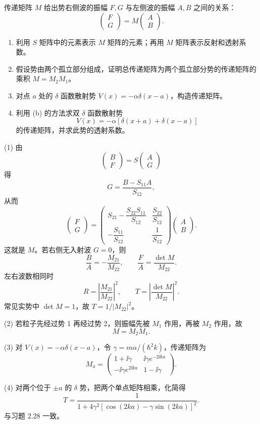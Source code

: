 \begin{question}
传递矩阵 $M$ 给出势右侧波的振幅 $F,G$ 与左侧波的振幅 $A,B$ 之间的关系：
\[
\begin{pmatrix}F\\G\end{pmatrix}=M\begin{pmatrix}A\\B\end{pmatrix}.
\]
\begin{enumerate}
\item 利用 $S$ 矩阵中的元素表示 $M$ 矩阵的元素；再用 $M$ 矩阵表示反射和透射系数。
\item 假设势由两个孤立部分组成，证明总传递矩阵为两个孤立部分势的传递矩阵的乘积 $M=M_2M_1$。
\item 对点 $a$ 处的 $\delta$ 函数散射势 $V(x)=-\alpha\delta(x-a)$，构造传递矩阵。
\item 利用 (b) 的方法求双 $\delta$ 函数散射势
\[
V(x)=-\alpha[\delta(x+a)+\delta(x-a)]
\]
的传递矩阵，并求此势的透射系数。
\end{enumerate}
\end{question}
\begin{solution}
(1) 由
\[
\begin{pmatrix}B\\F\end{pmatrix}
=S\begin{pmatrix}A\\G\end{pmatrix}
\]
得
\[
G=\frac{B-S_{11}A}{S_{12}},
\]
从而
\[
\begin{pmatrix}F\\G\end{pmatrix}
=\begin{pmatrix}
S_{21}-\dfrac{S_{22}S_{11}}{S_{12}}&\dfrac{S_{22}}{S_{12}}\\[0.8em]
-\dfrac{S_{11}}{S_{12}}&\dfrac1{S_{12}}
\end{pmatrix}
\begin{pmatrix}A\\B\end{pmatrix}.
\]
这就是 $M$。若右侧无入射波 $G=0$，则
\[
\frac BA=-\frac{M_{21}}{M_{22}},
\qquad
\frac FA=\frac{\det M}{M_{22}}.
\]
左右波数相同时
\[
R=\left|\frac{M_{21}}{M_{22}}\right|^2,
\qquad
T=\left|\frac{\det M}{M_{22}}\right|^2.
\]
常见实势中 $\det M=1$，故 $T=1/|M_{22}|^2$。

(2) 若粒子先经过势 1 再经过势 2，则振幅先被 $M_1$ 作用，再被 $M_2$ 作用，故
\[
M=M_2M_1.
\]

(3) 对 $V(x)=-\alpha\delta(x-a)$，令 $\gamma=m\alpha/(\hbar^2k)$，传递矩阵为
\[
M_a=\begin{pmatrix}
1+\ii\gamma&\ii\gamma e^{-2\ii ka}\\
-\ii\gamma e^{2\ii ka}&1-\ii\gamma
\end{pmatrix}.
\]

(4) 对两个位于 $\pm a$ 的 $\delta$ 势，把两个单点矩阵相乘，化简得
\[
T=\frac{1}{1+4\gamma^2[\cos(2ka)-\gamma\sin(2ka)]^2}.
\]
与习题 2.28 一致。
\end{solution}

